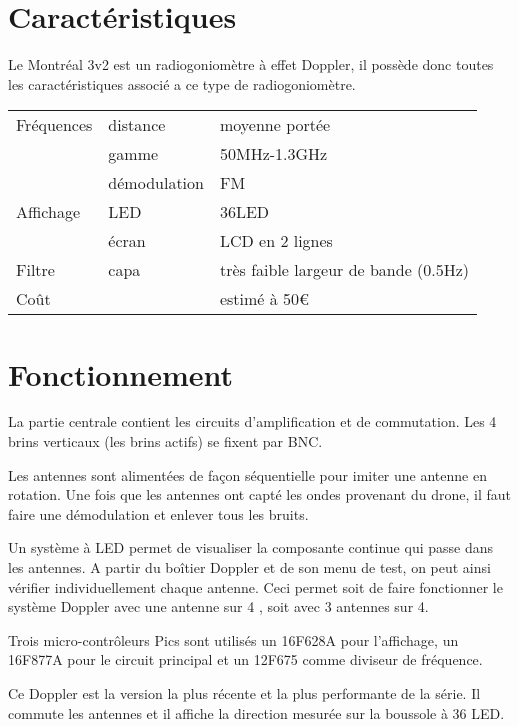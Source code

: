 \section{Caractéristiques}

Le Montréal 3v2 est un radiogoniomètre à effet Doppler, il possède donc toutes les caractéristiques associé a ce type de radiogoniomètre.
~\\

\begin{tabular}{ l l l}
Fréquences & distance & moyenne portée\\
 & gamme & 50MHz-1.3GHz\\
 & démodulation & FM\\
Affichage & LED & 36LED\\
& écran & LCD en 2 lignes\\
Filtre & capa & très faible largeur de bande (0.5Hz)\\
Coût & & estimé à 50\euro \\
\end{tabular}


\section{Fonctionnement}
La partie centrale contient les circuits d'amplification et de commutation. Les 4 brins verticaux (les brins actifs) se fixent par BNC.

Les antennes sont alimentées de façon séquentielle pour imiter une antenne en rotation. Une fois que les antennes ont capté les ondes provenant du drone, il faut faire une démodulation et enlever tous les bruits.


Un système à LED permet de visualiser la composante continue qui passe dans les antennes. A partir du boîtier Doppler et de son menu de test, on peut ainsi vérifier individuellement chaque antenne. Ceci permet soit de faire fonctionner le système Doppler avec une antenne sur 4 %
, soit avec 3 antennes sur 4. %


Trois micro-contrôleurs Pics sont utilisés un 16F628A pour l'affichage, un 16F877A pour le circuit principal et un 12F675 comme diviseur de fréquence.

Ce Doppler est la version la plus récente et la plus performante de la série. Il commute les antennes et il affiche la direction mesurée sur la boussole à 36 LED. 
~\\

